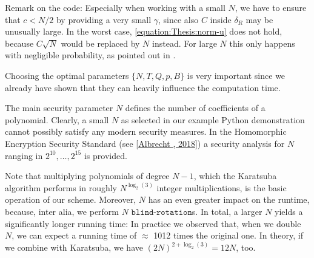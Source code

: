 \documentclass[letterpaper,10pt,english]{jupyterBook}
\begin{document}
\sphinxAtStartPar
Remark on the code:
Especially when working with a small \(N\), we have to ensure that \(c < N/2\) by providing a very small \(\gamma\), since also \(C\) inside \(\delta_R\) may be unusually large.
In the worst case, \eqref{equation:Thesis:norm-u} does not hold, because \(C\sqrt{N}\) would be replaced by \(N\) instead.
For large \(N\) this only happens with negligible probability, as pointed out in {\hyperref[\detokenize{Thesis:bound-for-multiplying-two-ring-elements}]{}}.

\label{\detokenize{Thesis:parameters-for-bootstrapping}}
\begin{DUlineblock}{0em}
\item[] 
\end{DUlineblock}

\sphinxAtStartPar
Choosing the optimal parameters \(\{N, T, Q, p, B\}\) is very important since we already have shown that they can heavily influence the computation time.

\begin{DUlineblock}{0em}
\item[] 
\end{DUlineblock}

\sphinxAtStartPar
The main security parameter \(N\) defines the number of coefficients of a polynomial.
Clearly, a small \(N\) as selected in our example Python demonstration cannot possibly satisfy any modern security measures.
In the Homomorphic Encryption Security Standard (see {[}\hyperlink{cite.Thesis:id68}{Albrecht , 2018}{]}) a security analysis for \(N\) ranging in \(2^{10},\dots,2^{15}\) is provided.

\sphinxAtStartPar
Note that multiplying polynomials of degree \(N-1\), which the Karatsuba algorithm performs in roughly \(N^{\log_2(3)}\) integer multiplications, is the basic operation of our scheme.
Moreover, \(N\) has an even greater impact on the runtime, because, inter alia, we perform \(N\) \(\texttt{blind-rotation}\)s.
In total, a larger \(N\) yields a significantly longer running time:
In practice we observed that, when we double \(N\), we can expect a running time of \(\approx\) 10\sphinxhyphen{}12 times the original one.
In theory, if we combine {\hyperref[\detokenize{Thesis:complexity-of-scaled-mod}]{}} with Karatsuba, we have \((2N)^{2+\log_2(3)} = 12N\), too.
\end{document}
